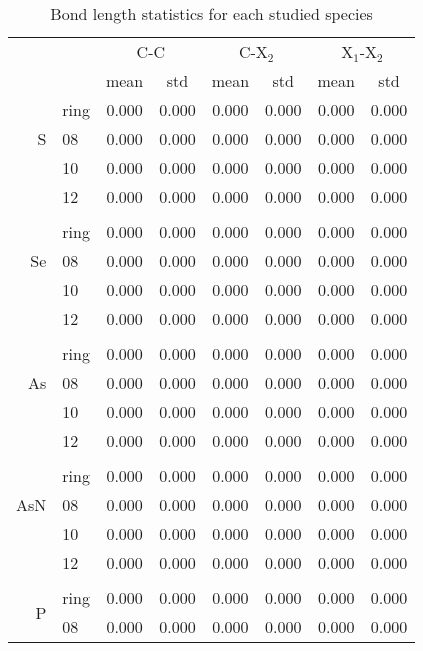 \begin{table}
    \centering
    \caption[Bond length study]{Bond length statistics for each studied species}
    \begin{tabular}{@{}rlcccccc@{}}
        \toprule
        && \multicolumn{2}{c}{C-C} & \multicolumn{2}{c}{C-X$_2$} & \multicolumn{2}{c}{X$_1$-X$_2$} \\
        && mean & std & mean & std & mean & std \\
        \midrule
        \multirow{3}{*}{S} & ring & 0.000 & 0.000 & 0.000 & 0.000 & 0.000 & 0.000 \\
        & 08 & 0.000 & 0.000 & 0.000 & 0.000 & 0.000 & 0.000 \\
        & 10 & 0.000 & 0.000 & 0.000 & 0.000 & 0.000 & 0.000 \\
        & 12 & 0.000 & 0.000 & 0.000 & 0.000 & 0.000 & 0.000 \\
        \\
        \multirow{3}{*}{Se} & ring & 0.000 & 0.000 & 0.000 & 0.000 & 0.000 & 0.000 \\
        & 08 & 0.000 & 0.000 & 0.000 & 0.000 & 0.000 & 0.000 \\
        & 10 & 0.000 & 0.000 & 0.000 & 0.000 & 0.000 & 0.000 \\
        & 12 & 0.000 & 0.000 & 0.000 & 0.000 & 0.000 & 0.000 \\
        \\
        \multirow{3}{*}{As} & ring & 0.000 & 0.000 & 0.000 & 0.000 & 0.000 & 0.000 \\
        & 08 & 0.000 & 0.000 & 0.000 & 0.000 & 0.000 & 0.000 \\
        & 10 & 0.000 & 0.000 & 0.000 & 0.000 & 0.000 & 0.000 \\
        & 12 & 0.000 & 0.000 & 0.000 & 0.000 & 0.000 & 0.000 \\
        \\
        \multirow{3}{*}{AsN} & ring & 0.000 & 0.000 & 0.000 & 0.000 & 0.000 & 0.000 \\
        & 08 & 0.000 & 0.000 & 0.000 & 0.000 & 0.000 & 0.000 \\
        & 10 & 0.000 & 0.000 & 0.000 & 0.000 & 0.000 & 0.000 \\
        & 12 & 0.000 & 0.000 & 0.000 & 0.000 & 0.000 & 0.000 \\
        \\
        \multirow{3}{*}{P} & ring & 0.000 & 0.000 & 0.000 & 0.000 & 0.000 & 0.000 \\
        & 08 & 0.000 & 0.000 & 0.000 & 0.000 & 0.000 & 0.000 \\

\end{tabular}
\end{table}
